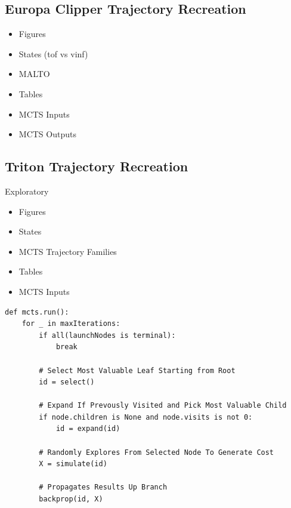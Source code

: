 \documentclass[letterpaper, preprint, paper,11pt]{AAS}	%
\begin{document}
\subsection{Europa Clipper Trajectory Recreation}


\begin{itemize}
    \item Figures
        \item States (tof vs vinf)
        \item MALTO
    \item Tables
        \item MCTS Inputs
        \item MCTS Outputs
\end{itemize}

\subsection{Triton Trajectory Recreation}
Exploratory

\begin{itemize}
    \item Figures
        \item States 
        \item MCTS Trajectory Families
    \item Tables
        \item MCTS Inputs
\end{itemize}

\begin{lstlisting}
def mcts.run():
    for _ in maxIterations:
        if all(launchNodes is terminal):
            break

        # Select Most Valuable Leaf Starting from Root
        id = select() 

        # Expand If Prevously Visited and Pick Most Valuable Child
        if node.children is None and node.visits is not 0:
            id = expand(id)

        # Randomly Explores From Selected Node To Generate Cost
        X = simulate(id) 

        # Propagates Results Up Branch
        backprop(id, X)
\end{lstlisting}

\appendix
\end{document}
